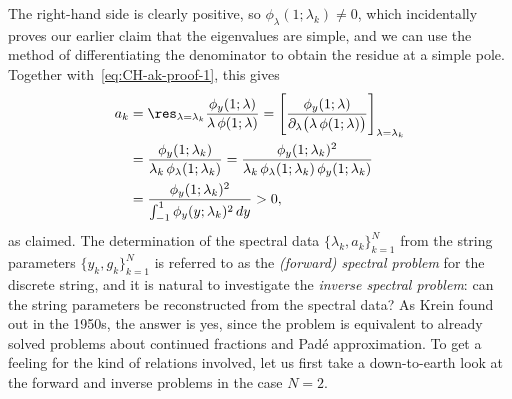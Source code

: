 \documentclass[10pt,a4paper]{article} \pdfoutput=1 
\begin{document}
The right-hand side is clearly positive, so $\phi_\lambda(1;\lambda_k) \neq 0$,
which incidentally proves our earlier claim that the eigen\-values are simple,
and we can use the method of differentiating the denominator to obtain the residue at a simple pole.
Together with~\eqref{eq:CH-ak-proof-1}, this gives
\begin{equation}
  \label{eq:CH-ak-proof-2}
  \begin{split}
    a_k
    & = \res_{\lambda=\lambda_k} \frac{\phi_y(1;\lambda)}{\lambda \, \phi(1;\lambda)}
    = \left[ \frac{\phi_y(1;\lambda)}{\partial_\lambda \bigl( \lambda \, \phi(1;\lambda) \bigr) } \right]_{\lambda=\lambda_k}
    \\ &
    = \frac{\phi_y(1;\lambda_k)}{\lambda_k \, \phi_\lambda(1;\lambda_k)}
    = \frac{\phi_y(1;\lambda_k)^2}{\lambda_k \, \phi_\lambda(1;\lambda_k) \, \phi_y(1;\lambda_k)}
    \\ &
    = \frac{\phi_y(1;\lambda_k)^2}{ \int_{-1}^1 \phi_y(y;\lambda_k)^2 \, dy}
    > 0
    ,
  \end{split}
\end{equation}
as claimed.
The determination of the spectral data $\{ \lambda_k, a_k \}_{k=1}^N$
from the string parameters $\{ y_k, g_k \}_{k=1}^N$
is referred to as the \emph{(forward) spectral problem} for the discrete string,
and it is natural to investigate the \emph{inverse spectral problem}: can the
string parameters be reconstructed from the spectral data?
As Krein found out in the 1950s, the answer is yes, since the problem
is equivalent to already solved problems about continued fractions and Padé approximation.
To get a feeling for the kind of relations involved,
let us first take a down-to-earth look at the forward and inverse problems in the case $N=2$.
\end{document}
